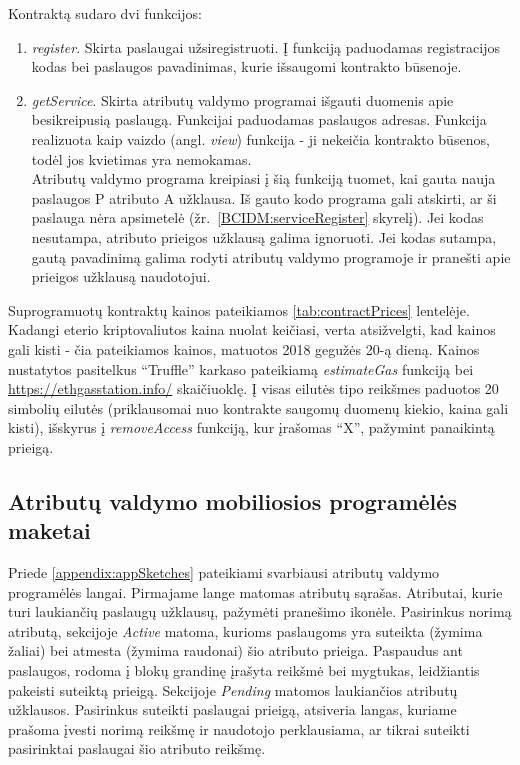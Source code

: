 Kontraktą sudaro dvi funkcijos:

\begin{enumerate}
    \item \textit{register}. Skirta paslaugai užsiregistruoti. Į funkciją paduodamas registracijos kodas bei paslaugos pavadinimas, kurie išsaugomi kontrakto būsenoje.
    \item \textit{getService}. Skirta atributų valdymo programai išgauti duomenis apie besikreipusią paslaugą. Funkcijai paduodamas paslaugos adresas.
    Funkcija realizuota kaip vaizdo (angl. \textit{view}) funkcija - ji nekeičia kontrakto būsenos, todėl jos kvietimas yra nemokamas. \\ 
    Atributų valdymo programa kreipiasi į šią funkciją tuomet, kai gauta nauja paslaugos P atributo A užklausa.
    Iš gauto kodo programa gali atskirti, ar ši paslauga nėra apsimetelė
    (žr.\hypertarget{BCIDM:serviceRegister}{~\ref{BCIDM:serviceRegister} skyrelį}). Jei kodas nesutampa, atributo prieigos užklausą galima ignoruoti. Jei kodas sutampa,
    gautą pavadinimą galima rodyti atributų valdymo programoje ir pranešti apie prieigos užklausą naudotojui.
\end{enumerate}

Suprogramuotų kontraktų kainos pateikiamos \hypertarget{tab:contractPrices}{\ref{tab:contractPrices}} lentelėje. Kadangi eterio kriptovaliutos kaina
nuolat keičiasi, verta atsižvelgti, kad kainos gali kisti - čia pateikiamos kainos, matuotos 2018 gegužės 20-ą dieną. Kainos nustatytos
pasitelkus \enquote{Truffle} karkaso pateikiamą \textit{estimateGas} funkciją bei \url{https://ethgasstation.info/} skaičiuoklę.
Į visas eilutės tipo reikšmes paduotos 20 simbolių eilutės (priklausomai nuo kontrakte saugomų duomenų kiekio, kaina gali kisti), išskyrus
į \textit{removeAccess} funkciją, kur įrašomas \enquote{X}, pažymint panaikintą prieigą.



\subsection{Atributų valdymo mobiliosios programėlės maketai}

Priede \hypertarget{appendix:appSketches}{\ref{appendix:appSketches}} pateikiami svarbiausi atributų valdymo programėlės langai.
Pirmajame lange matomas atributų sąrašas. Atributai, kurie turi laukiančių paslaugų užklausų, pažymėti pranešimo ikonėle. Pasirinkus norimą
atributą, sekcijoje \textit{Active} matoma, kurioms paslaugoms yra suteikta (žymima žaliai) bei atmesta (žymima raudonai) šio
atributo prieiga. Paspaudus ant paslaugos, rodoma į blokų grandinę įrašyta reikšmė
bei mygtukas, leidžiantis pakeisti suteiktą prieigą. Sekcijoje \textit{Pending} matomos laukiančios atributų užklausos. Pasirinkus
suteikti paslaugai prieigą, atsiveria langas, kuriame prašoma įvesti norimą reikšmę ir naudotojo perklausiama, ar tikrai suteikti 
pasirinktai paslaugai šio atributo reikšmę.

